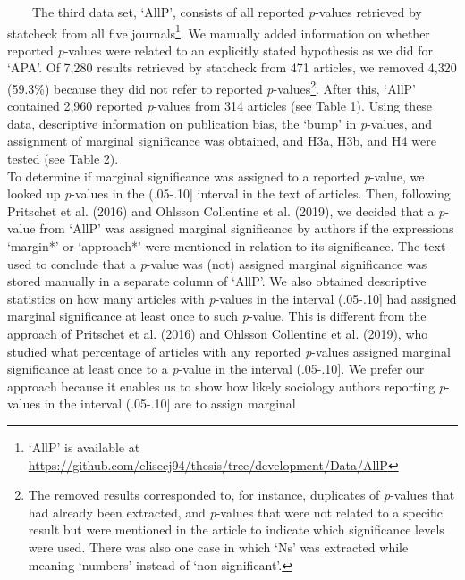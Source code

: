 \documentclass[
  12pt,
]{article}
\begin{document}
~~~~The third data set, `AllP', consists of all reported \emph{p}-values
retrieved by statcheck from all five journals\footnote{`AllP' is
  available at
  \url{https://github.com/elisecj94/thesis/tree/development/Data/AllP}}.
We manually added information on whether reported \emph{p}-values were
related to an explicitly stated hypothesis as we did for `APA'. Of 7,280
results retrieved by statcheck from 471 articles, we removed 4,320
(59.3\%) because they did not refer to reported
\emph{p}-values\footnote{The removed results corresponded to, for
  instance, duplicates of \emph{p}-values that had already been
  extracted, and \emph{p}-values that were not related to a specific
  result but were mentioned in the article to indicate which
  significance levels were used. There was also one case in which `Ns'
  was extracted while meaning `numbers' instead of `non-significant'.}.
After this, `AllP' contained 2,960 reported \emph{p}-values from 314
articles (see Table 1). Using these data, descriptive information on
publication bias, the `bump' in \emph{p}-values, and assignment of
marginal significance was obtained, and H3a, H3b, and H4 were tested
(see Table 2).\\
\hspace*{0.333em}\hspace*{0.333em}\hspace*{0.333em}\hspace*{0.333em}To
determine if marginal significance was assigned to a reported
\emph{p}-value, we looked up \emph{p}-values in the (.05-.10{]} interval
in the text of articles. Then, following Pritschet et al. (2016) and
Ohlsson Collentine et al. (2019), we decided that a \emph{p}-value from
`AllP' was assigned marginal significance by authors if the expressions
`margin*' or `approach*' were mentioned in relation to its significance.
The text used to conclude that a \emph{p}-value was (not) assigned
marginal significance was stored manually in a separate column of
`AllP'. We also obtained descriptive statistics on how many articles
with \emph{p}-values in the interval (.05-.10{]} had assigned marginal
significance at least once to such \emph{p}-value. This is different
from the approach of Pritschet et al. (2016) and Ohlsson Collentine et
al. (2019), who studied what percentage of articles with any reported
\emph{p}-values assigned marginal significance at least once to a
\emph{p}-value in the interval (.05-.10{]}. We prefer our approach
because it enables us to show how likely sociology authors reporting
\emph{p}-values in the interval (.05-.10{]} are to assign marginal
\end{document}
